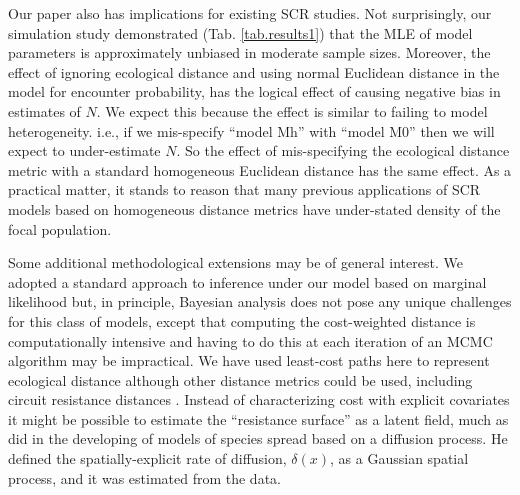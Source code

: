 \documentclass[12pt]{article}
\begin{document}
\begin{spacing}{1.8}
Our paper also has implications for existing SCR studies.
Not surprisingly, our simulation study demonstrated
(Tab. \ref{tab.results1})
that the MLE of model parameters is
approximately unbiased in moderate sample sizes. Moreover, the effect
of ignoring ecological distance and using normal Euclidean distance in
the model for encounter probability, has the logical effect of causing
negative bias in estimates of $N$.  We expect this because the effect
is similar to failing to model heterogeneity. i.e., if we mis-specify
``model Mh'' with ``model M0''
\citep{otis_etal:1978} then we will expect to under-estimate $N$. So
the effect of mis-specifying the ecological distance metric with a
standard homogeneous Euclidean distance has the same effect. As a
practical matter, it stands to reason that many previous applications
of SCR models based on homogeneous distance metrics have under-stated
density of the focal population.




Some additional methodological extensions may be of general interest.
We adopted a standard approach to inference under our model based on
marginal likelihood but, in principle,
Bayesian analysis does not pose any unique challenges for this
class of models, except that computing the cost-weighted distance is
computationally intensive and having to do this at each iteration of
an MCMC algorithm may be impractical. We have used least-cost paths here to represent ecological distance
although other distance metrics could be used, including circuit
resistance distances \citep{mcrae:2006}. Instead of
characterizing cost with explicit covariates it might be possible to
estimate the ``resistance surface'' as a latent field, much as
\citet{wikle:2003} did in the developing of models of species spread
based on a diffusion process. He defined the spatially-explicit rate
of diffusion, $\delta(x)$, as a Gaussian spatial process, and it was
estimated from the data.









\newpage





\end{spacing}



\clearpage

\newpage
\end{document}
